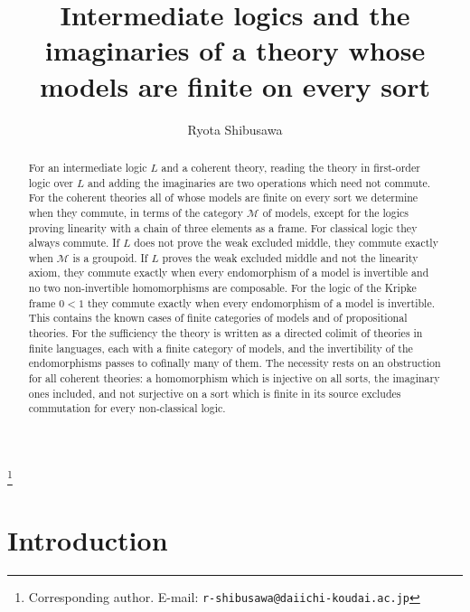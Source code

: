 \documentclass[11pt]{amsart}
\theoremstyle{definition}
\newcommand{\cM}{\mathcal M}
\begin{document}
\title[Intermediate logics and theories with finite sorts]{Intermediate
logics and the imaginaries of a theory whose models are finite on
every sort}
\author{Ryota Shibusawa}
\thanks{Corresponding author. E-mail: \texttt{r-shibusawa@daiichi-koudai.ac.jp}}
\address{Daiichi Institute of Technology}

\begin{abstract}
For an intermediate logic $L$ and a coherent theory, reading the
theory in first-order logic over $L$ and adding the imaginaries are two
operations which need not commute. For the coherent theories all of
whose models are finite on every sort we determine when they commute,
in terms of the category $\cM$ of models, except for the logics
proving linearity with a chain of three elements as a frame. For classical logic they
always commute. If $L$ does not prove the weak excluded middle, they
commute exactly when $\cM$ is a groupoid. If $L$ proves the weak
excluded middle and not the linearity axiom, they commute exactly when
every endomorphism of a model is invertible and no two non-invertible
homomorphisms are composable. For the logic of the Kripke frame $0<1$
they commute exactly when every endomorphism of a model is invertible.
This contains the known cases of finite categories of models and of
propositional theories. For the sufficiency the
theory is written as a directed colimit of theories in finite
languages, each with a finite category of models, and the
invertibility of the endomorphisms passes to cofinally many of them. The
necessity rests on an obstruction for all coherent theories: a
homomorphism which is injective on all sorts, the imaginary ones
included, and not surjective on a sort which is finite in its source
excludes commutation for every non-classical logic.
\end{abstract}

\maketitle

\section{Introduction}
\end{document}
